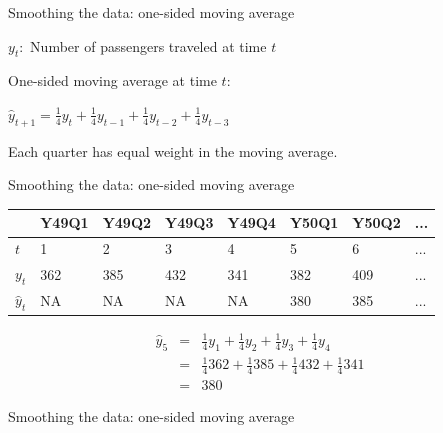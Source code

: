 \documentclass{beamer}\usepackage[]{graphicx}\usepackage[]{color}
\begin{document}
\begin{darkframes}
\begin{frame}[fragile]{Smoothing the data: one-sided moving average}
        \begin{center}
          $y_t:$ Number of passengers traveled at time $t$
        \end{center}  
        
        One-sided moving average at time $t$:
        
        \begin{center}
          $\hat y_{t+1} = \frac{1}{4} y_{t} + \frac{1}{4} y_{t-1} + \frac{1}{4} y_{t-2} + \frac{1}{4} y_{t-3}$
        \end{center}  
        Each quarter has equal weight in the moving average.
        
    \end{frame}
    
    
    
    \begin{frame}[fragile]{Smoothing the data: one-sided moving average}
      \fontsize{9}{9}\selectfont
      \begin{center}
          \begin{tabular}{llllllll}
          \hline
            & Y49Q1 & Y49Q2 & Y49Q3 & Y49Q4 & Y50Q1 & Y50Q2 & ... \\
          \hline
           $t$ & 1  &	2 &	3 &	4 &	5 &	6 & ... \\
          $y_t$ & 362 &	385 &	432 &	341 &	382 &	409 & ... \\
          $\hat y_t$ & NA &	NA &	NA & NA &	380	& 385 & ... \\
            \hline 
        \end{tabular}
      \end{center} \pause
      
      \begin{center}
        \begin{eqnarray*}
          \hat y_5 &=& \frac{1}{4} y_{1} + \frac{1}{4} y_{2} + \frac{1}{4} y_{3} + \frac{1}{4} y_{4} \\
          &=& \frac{1}{4} 362 + \frac{1}{4} 385 + \frac{1}{4} 432 + \frac{1}{4} 341 \\
          &=& 380
        \end{eqnarray*}
      \end{center} 
      
    \end{frame}
    
    
    

    \begin{frame}[fragile]{Smoothing the data: one-sided moving average}
      \fontsize{8}{8}\selectfont
  

\end{frame}
\end{darkframes}
\end{document}
